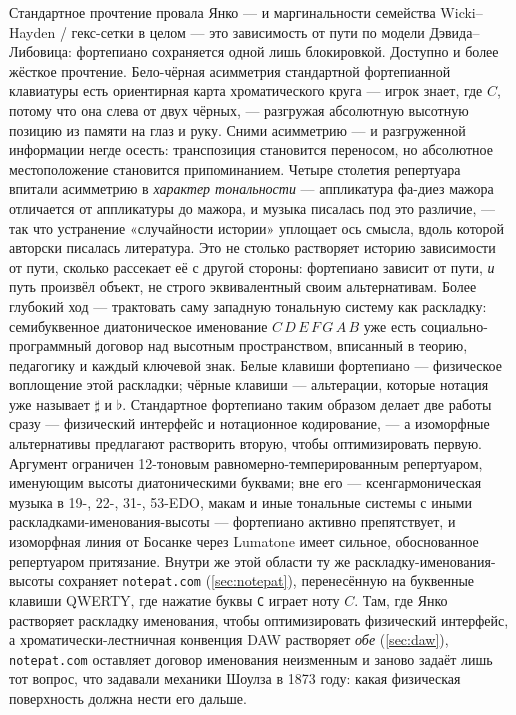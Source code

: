 \documentclass[10pt,letterpaper,twocolumn]{article}
\begin{document}
Стандартное прочтение провала Янко --- и маргинальности семейства Wicki--Hayden / гекс-сетки в целом --- это зависимость от пути по модели Дэвида--Либовица: фортепиано сохраняется одной лишь блокировкой. Доступно и более жёсткое прочтение. Бело-чёрная асимметрия стандартной фортепианной клавиатуры есть ориентирная карта хроматического круга --- игрок знает, где $C$, потому что она слева от двух чёрных, --- разгружая абсолютную высотную позицию из памяти на глаз и руку. Сними асимметрию --- и разгруженной информации негде осесть: транспозиция становится переносом, но абсолютное местоположение становится припоминанием. Четыре столетия репертуара впитали асимметрию в \emph{характер тональности} --- аппликатура фа-диез мажора отличается от аппликатуры до мажора, и музыка писалась под это различие, --- так что устранение «случайности истории» уплощает ось смысла, вдоль которой авторски писалась литература. Это не столько растворяет историю зависимости от пути, сколько рассекает её с другой стороны: фортепиано зависит от пути, \emph{и} путь произвёл объект, не строго эквивалентный своим альтернативам. Более глубокий ход --- трактовать саму западную тональную систему как раскладку: семибуквенное диатоническое именование $C\,D\,E\,F\,G\,A\,B$ уже есть социально-программный договор над высотным пространством, вписанный в теорию, педагогику и каждый ключевой знак. Белые клавиши фортепиано --- физическое воплощение этой раскладки; чёрные клавиши --- альтерации, которые нотация уже называет $\sharp$ и $\flat$. Стандартное фортепиано таким образом делает две работы сразу --- физический интерфейс и нотационное кодирование, --- а изоморфные альтернативы предлагают растворить вторую, чтобы оптимизировать первую. Аргумент ограничен 12-тоновым равномерно-темперированным репертуаром, именующим высоты диатоническими буквами; вне его --- ксенгармоническая музыка в 19-, 22-, 31-, 53-EDO, макам и иные тональные системы с иными раскладками-именования-высоты --- фортепиано активно препятствует, и изоморфная линия от Босанке через Lumatone имеет сильное, обоснованное репертуаром притязание. Внутри же этой области ту же раскладку-именования-высоты сохраняет \texttt{notepat.com} (\textsection\ref{sec:notepat}), перенесённую на буквенные клавиши QWERTY, где нажатие буквы \texttt{C} играет ноту $C$. Там, где Янко растворяет раскладку именования, чтобы оптимизировать физический интерфейс, а хроматически-лестничная конвенция DAW растворяет \emph{обе} (\textsection\ref{sec:daw}), \texttt{notepat.com} оставляет договор именования неизменным и заново задаёт лишь тот вопрос, что задавали механики Шоулза в 1873 году: какая физическая поверхность должна нести его дальше.
\end{document}
